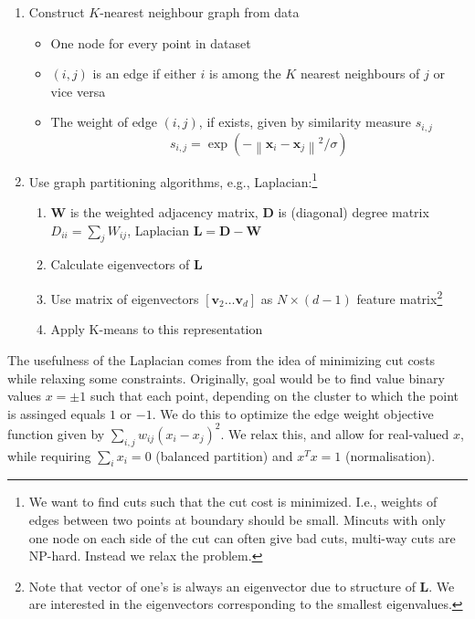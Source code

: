 \documentclass[11pt, %
	oneside, %
	english, %
	onehalfspacing, %
	parskip, %
	]{article} %
\theoremstyle{definition}
\begin{document}
\begin{enumerate}
	\item Construct $K$-nearest neighbour graph from data
	\begin{itemize}
		\item One node for every point in dataset
		\item $(i, j)$ is an edge if either $i$ is among the $K$ nearest neighbours of $j$ or vice versa
		\item The weight of edge $(i, j)$, if exists,  given by similarity measure $s_{i, j}$
		$$
		s_{i, j}=\exp \left(-\left\|\mathbf{x}_i-\mathbf{x}_j\right\|^2 / \sigma\right)
		$$
	\end{itemize}
	\item Use graph partitioning algorithms, e.g., Laplacian:\footnote{We want to find cuts such that the cut cost is minimized. I.e., weights of edges between two points at boundary should be small. Mincuts with only one node on each side of the cut can often give bad cuts, multi-way cuts are NP-hard. Instead we relax the problem.}
	\begin{enumerate}
		\item $\mathbf{W}$ is the weighted adjacency matrix, $\mathbf{D }$ is (diagonal) degree matrix $D_{i i}=\sum_j W_{i j}$, Laplacian $\mathbf{L}=\mathbf{D}-\mathbf{W}$
		\item Calculate eigenvectors of $\mathbf{L}$
		\item Use matrix of eigenvectors $[\mathbf{v}_2 \dots \mathbf{v}_d]$ as $N \times (d-1)$ feature matrix\footnote{Note that vector of one's is always an eigenvector due to structure of $\mathbf{L}$. We are interested in the eigenvectors corresponding to the smallest eigenvalues.}
		\item Apply K-means to this representation
	\end{enumerate}
\end{enumerate}

The usefulness of the Laplacian comes from the idea of minimizing cut costs while relaxing some constraints. Originally, goal would be to find value binary values $x = \pm 1$ such that each point, depending on the cluster to which the point is assinged equals $1$ or $-1$. We do this to optimize the edge weight objective function given by $\sum_{i, j} w_{i j}\left(x_i-x_j\right)^2$. We relax this, and allow for real-valued $x$, while requiring $\sum_i x_i = 0$ (balanced partition) and $x^Tx = 1$ (normalisation).
\end{document}
